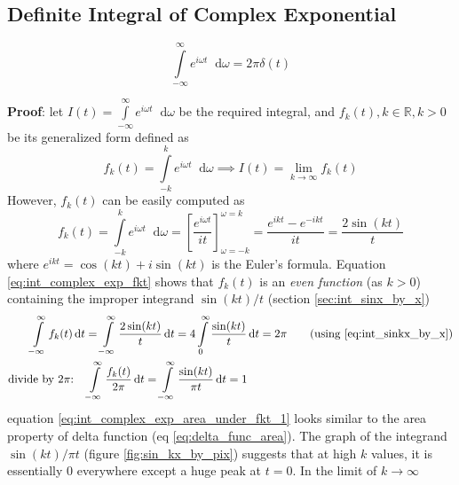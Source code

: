 \documentclass[11pt, a4paper]{article}
\newcommand{\eqrefnp}[1]{\textup{\ref{#1}}}  %
\newcommand{\diff}{\mathop{}\!\mathrm{d}}
\newcommand{\dt}{\diff t}
\newcommand{\domega}{\diff \omega}
\newcommand{\dint}[2]{\int \limits_{#1}^{#2}}  %
\newcommand{\intinfty}{\dint{-\infty}{\infty}}	%
\newcommand{\intzerotoinfty}{\dint{0}{\infty}}	%
\begin{document}
	\subsection{Definite Integral of Complex Exponential}\label{sec:int_complex_exp}
	\begin{equation}\label{eq:int_complex_exp}
		\intinfty e^{i\omega t} \domega = 2\pi \delta (t)
	\end{equation}
	
	\vspace{4pt}
	\textbf{Proof}: \cite{herman2016fourieranalysis} let $I(t) = \intinfty e^{i\omega t} \domega$ be the required integral, and $f_{k}(t), k\in \mathbb{R}, k > 0$ be its generalized form defined as
	\begin{equation}\label{eq:int_complex_exp_It_as_fkt}
		f_{k}(t) = \dint{-k}{k} e^{i\omega t} \domega \implies I(t) = \lim\limits_{k \to \infty} f_{k}(t)
	\end{equation}
	However, $f_{k}(t)$ can be easily computed as
	\begin{equation}\label{eq:int_complex_exp_fkt}
		f_{k}(t) = \dint{-k}{k} e^{i\omega t} \domega = \left[\frac{e^{i\omega t}}{it}\right]_{\omega=-k}^{\omega=k} = \frac{e^{ikt} - e^{-ikt}}{it} = \frac{2\sin(kt)}{t}
	\end{equation}
	where $e^{ikt}=\cos(kt) + i\sin(kt)$ is the Euler's formula. Equation \eqref{eq:int_complex_exp_fkt} shows that $f_{k}(t)$ is an \textit{even function} (as $k > 0$) containing the improper integrand $\sin(kt)/t$ (section \ref{sec:int_sinx_by_x})
	\begin{align}
		\intinfty f_{k}(t) \dt & = \intinfty \frac{2\sin(kt)}{t} \dt = 4 \intzerotoinfty \frac{\sin(kt)}{t} \dt = 2\pi	\tag{using \eqrefnp{eq:int_sinkx_by_x}} \nonumber \\
		\text{divide by $2\pi$:} \quad & \intinfty \frac{f_{k}(t)}{2\pi} \dt = \intinfty \frac{\sin(kt)}{\pi t} \dt = 1 \label{eq:int_complex_exp_area_under_fkt_1}
	\end{align}
	equation \eqref{eq:int_complex_exp_area_under_fkt_1} looks similar to the area property of delta function (eq \eqrefnp{eq:delta_func_area}). The graph of the integrand $\sin(kt)/\pi t$ (figure \ref{fig:sin_kx_by_pix}) suggests that at high $k$ values, it is essentially $0$ everywhere except a huge peak at $t=0$. In the limit of $k \to \infty$
\end{document}
